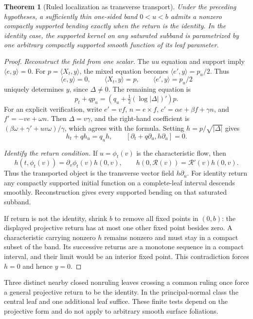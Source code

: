 \documentclass[11pt]{amsart}
\newtheorem{theorem}{Theorem}[section]
\theoremstyle{definition}
\theoremstyle{remark}
\numberwithin{equation}{section}
\begin{document}
\begin{theorem}[Ruled localization as transverse transport]
\label{thm:general-ruled-kernel}
Under the preceding hypotheses, a sufficiently thin one-sided band
$0<u<b$ admits a nonzero compactly supported bending exactly when the
return is the identity. In the identity case, the supported kernel on
any saturated subband is parametrized by one arbitrary compactly supported
smooth function of its leaf parameter.
\end{theorem}
\begin{proof}
\emph{Reconstruct the field from one scalar.}
The $uu$ equation and support imply $\langle e,y\rangle=0$.
For $p=\langle X_t,y\rangle$, the mixed equation becomes
$\langle e',y\rangle=p_u/2$. Thus
\begin{equation}\label{eq:general-bending-reconstruction}
 \langle e,y\rangle=0,\qquad \langle X_t,y\rangle=p,
 \qquad\langle e',y\rangle=p_u/2
\end{equation}
uniquely determines $y$, since $\Delta\ne0$. The remaining equation is
\[
 p_t+qp_u=\left(q_u+\tfrac12(\log|\Delta|)'\right)p.
\]
For an explicit verification, write $e'=vf$, $n=e\times f$,
$c'=\alpha e+\beta f+\gamma n$, and $f'=-ve+\omega n$.
Then $\Delta=v\gamma$, and the right-hand coefficient is
$(\beta\omega+\gamma'+uv\omega)/\gamma$, which agrees with the formula.
Setting $h=p/\sqrt{|\Delta|}$ gives
\begin{equation}\label{eq:transverse-vector-transport}
 h_t+qh_u=q_uh,
 \qquad[\partial_t+q\partial_u,h\partial_u]=0.
\end{equation}

\emph{Identify the return condition.}
If $u=\phi_t(v)$ is the characteristic flow, then
\[
 h(t,\phi_t(v))=\partial_v\phi_t(v)h(0,v),\qquad
 h(0,\mathcal R(v))=\mathcal R'(v)h(0,v).
\]
Thus the transported object is the transverse vector field $h\partial_u$.
For identity return any compactly supported initial function on a
complete-leaf interval descends smoothly. Reconstruction gives every
supported bending on that saturated subband.

If return is not the identity, shrink $b$ to remove all fixed points in
$(0,b)$: the displayed projective return has at most one other fixed
point besides zero. A characteristic carrying nonzero $h$ remains nonzero
and must stay in a compact subset of the band. Its successive returns
are a monotone sequence in a compact interval, and their limit would be
an interior fixed point. This contradiction forces $h=0$ and hence $y=0$.
\end{proof}
Three distinct nearby closed nonruling leaves crossing a common ruling
once force a general projective return to be the identity. In the
principal-normal class the central leaf and one additional leaf suffice.
These finite tests depend on the projective form and do not apply to
arbitrary smooth surface foliations.
\end{document}

